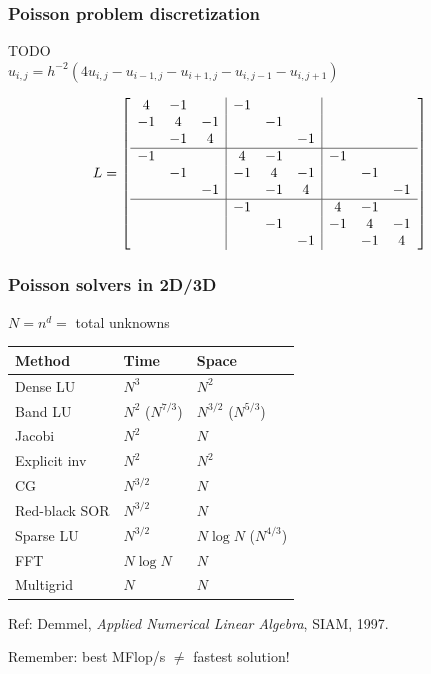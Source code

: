 \documentclass{beamer}
\begin{document}
\begin{frame}
  \frametitle{Poisson problem discretization}

  \begin{center}
    TODO \\
  $
    u_{i,j} = h^{-2} \left( 4u_{i,j}-u_{i-1,j}-u_{i+1,j}-u_{i,j-1}-u_{i,j+1} \right)
  $
  \end{center}

  \[
  L =
  \left[
  \begin{array}{ccc|ccc|ccc}
     4 & -1 &    & -1 &    &    &    &    &    \\
    -1 &  4 & -1 &    & -1 &    &    &    &    \\
       & -1 &  4 &    &    & -1 &    &    &    \\ \hline
    -1 &    &    &  4 & -1 &    & -1 &    &    \\
       & -1 &    & -1 &  4 & -1 &    & -1 &    \\
       &    & -1 &    & -1 &  4 &    &    & -1 \\ \hline
       &    &    & -1 &    &    &  4 & -1 &    \\
       &    &    &    & -1 &    & -1 &  4 & -1 \\
       &    &    &    &    & -1 &    & -1 &  4 
  \end{array}
  \right]
  \]
\end{frame}


\begin{frame}
  \frametitle{Poisson solvers in 2D/3D}

  $N = n^d = $ total unknowns
  \vspace{2mm}

  \begin{tabular}{l|ll}
    Method & Time & Space \\ \hline
    Dense LU     & $N^3$          & $N^2$ \\
    Band LU      & $N^2$ ($N^{7/3}$) & $N^{3/2}$ ($N^{5/3}$) \\
    Jacobi       & $N^2$          & $N$ \\
    Explicit inv & $N^2$          & $N^2$ \\
    CG           & $N^{3/2}$       & $N$ \\
    Red-black SOR & $N^{3/2}$      & $N$ \\
    Sparse LU    & $N^{3/2}$       & $N \log N$ ($N^{4/3}$) \\
    FFT         & $N \log N$       & $N$ \\
    Multigrid   & $N$              & $N$
  \end{tabular}

  \vspace{5mm}
  Ref: Demmel, {\em Applied Numerical Linear Algebra}, SIAM, 1997.
  
  \vspace{5mm}
  Remember: best MFlop/s $\neq$ fastest solution!

\end{frame}
\end{document}
